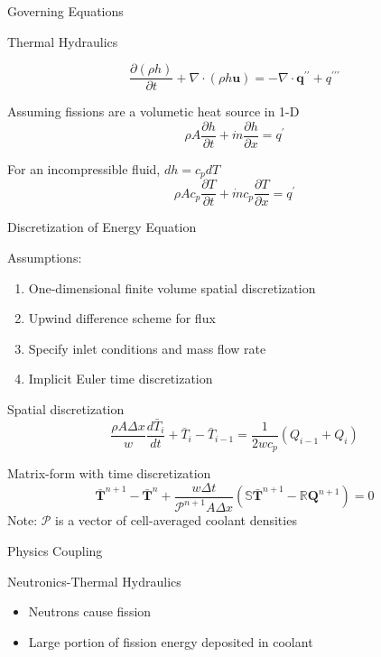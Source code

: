 \documentclass{beamer}
\begin{document}
\begin{section}{Governing Equations}
\begin{frame}{Thermal Hydraulics}
\begin{customlist}{2ex}{0pt}
  \[
   \frac{\partial\left(\rho h\right)}{\partial t}+\nabla\cdot\left(\rho h\mathbf{u}\right)=-\nabla\cdot\mathbf{q}^{\prime\prime}+q^{\prime\prime\prime}
  \]
  \vfill\item Assuming fissions are a volumetic heat source in 1-D
  \[
   \rho A\frac{\partial h}{\partial t}+\dot{m}\frac{\partial h}{\partial x}=q^{\prime}
  \]
  \vfill\item For an incompressible fluid, $dh=c_{p}dT$
  \[
   \rho Ac_{p}\frac{\partial T}{\partial t}+\dot{m}c_{p}\frac{\partial T}{\partial x}=q^{\prime}
  \]
\end{customlist}
\end{frame}
\begin{frame}{Discretization of Energy Equation}
\begin{block}{Assumptions:}
\begin{enumerate}
  \item One-dimensional finite volume spatial discretization
  \item Upwind difference scheme for flux
  \item Specify inlet conditions and mass flow rate
  \item Implicit Euler time discretization
\end{enumerate}
\end{block}
\begin{customlist}{2ex}{0pt}
  \item Spatial discretization
  \[
   \frac{\rho A\Delta x}{w}\frac{d\bar{T}_{i}}{dt}+\bar{T}_{i}-\bar{T}_{i-1}=\frac{1}{2wc_{p}}\left(Q_{i-1}+Q_{i}\right)
  \]
  \item Matrix-form with time discretization
  \[
   \mathbf{\bar{T}}^{n+1}-\mathbf{\bar{T}}^{n}+\frac{w\Delta t}{\mathcal{P}^{n+1}A\Delta x}\left(\mathbb{S}\mathbf{\bar{T}}^{n+1}-\mathbb{R}\mathbf{Q}^{n+1}\right)=0
  \]
  \alert{Note:} $\mathcal{P}$ is a vector of cell-averaged coolant densities
\end{customlist}
\end{frame}
\begin{frame}{Physics Coupling}
\begin{block}{Neutronics-Thermal Hydraulics}
  \begin{itemize}
    \item Neutrons cause fission
    \item Large portion of fission energy deposited in coolant

\end{itemize}
\end{block}
\end{frame}
\end{section}
\end{document}

